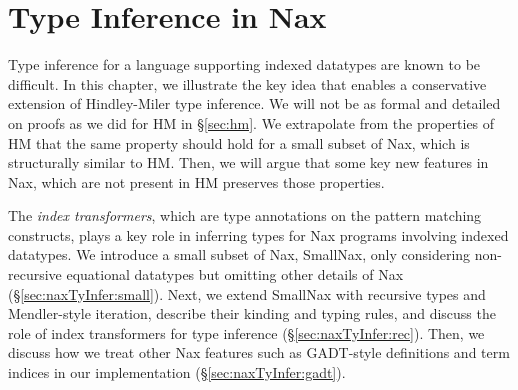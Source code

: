 \chapter{Type Inference in Nax} \label{ch:naxTyInfer}
Type inference for a language supporting indexed datatypes are
known to be difficult. 
In this chapter, we illustrate the key idea that enables a conservative
extension of Hindley-Miler type inference. We will not be as formal and
detailed on proofs as we did for HM in \S\ref{sec:hm}. We extrapolate from
the properties of HM that the same property should hold for
a small subset of Nax, which is structurally similar to HM.
Then, we will argue that some key new features in Nax, which are
not present in HM preserves those properties.

The \emph{index transformers}, which are type annotations on
the pattern matching constructs, plays a key role in inferring types for
Nax programs involving indexed datatypes. We introduce a small subset of Nax,
SmallNax, only considering non-recursive equational datatypes but omitting
other details of Nax (\S\ref{sec:naxTyInfer:small}). Next, we extend SmallNax
with recursive types and Mendler-style iteration, describe their kinding and
typing rules, and discuss the role of index transformers for type inference
(\S\ref{sec:naxTyInfer:rec}). Then, we discuss how we treat other Nax features
such as GADT-style definitions and term indices in our implementation
(\S\ref{sec:naxTyInfer:gadt}).

